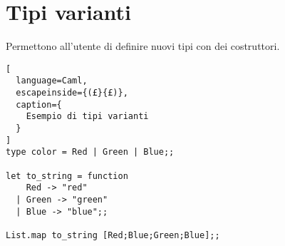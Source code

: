 \section{Tipi varianti}
Permettono all'utente di definire nuovi tipi con dei costruttori.

\begin{lstlisting}[
  language=Caml,
  escapeinside={(£}{£)},
  caption={
    Esempio di tipi varianti
  }
]
type color = Red | Green | Blue;;

let to_string = function
    Red -> "red"
  | Green -> "green"
  | Blue -> "blue";;

List.map to_string [Red;Blue;Green;Blue];;
\end{lstlisting}
